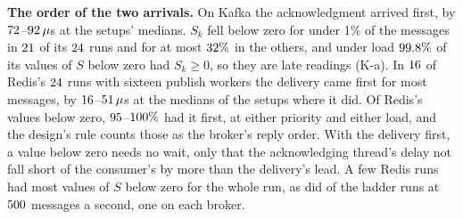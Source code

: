 \documentclass[10pt,journal,onecolumn]{IEEEtran}
\newcommand{\kafka}{Kafka}
\newcommand{\redis}{Redis}
\begin{document}
\begin{table}[tb]
\caption{\textbf{Freeze 41's predictions and what its runs gave.} Each setup's value is the median
over its runs unless a prediction pools messages (K-a, K-b); ratios are loaded over idle, real-time
over loaded, or the rule off over the rule on. Generated at build time from the committed run
tables through the block's own judge.}
\label{stab:orderscope}
\centering
\scriptsize

\end{table}

\textbf{The order of the two arrivals.} On \kafka{} the acknowledgment arrived first, by
$72$--$92\,\mu$s at the setups' medians. $S_k$ fell below zero for
under 1\% of the messages in $21$ of its $24$ runs and for at most
$32\%$ in the others, and under load $99.8\%$ of its values of $S$ below
zero had $S_k \geq 0$, so they are late readings (K-a). In
$16$ of \redis{}'s $24$ runs with sixteen publish workers the delivery
came first for most messages, by $16$--$51\,\mu$s at the medians of the
setups where it did. Of \redis{}'s values below zero, $95$--$100\%$
had it first, at either priority and either load, and the design's rule counts those as the
broker's reply order. With the delivery first, a value below zero needs no
wait, only that the acknowledging thread's delay not fall short of the consumer's by more than the
delivery's lead. A few \redis{} runs had most values of $S$ below zero for the whole run,
as did \osMidSplitRunsWord{} of the \osMidRunsWord{} ladder runs at $500$ messages a second,
one on each broker.
\end{document}
